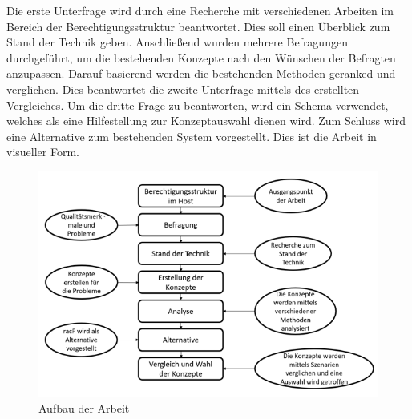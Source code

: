 Die erste Unterfrage wird durch eine Recherche mit verschiedenen Arbeiten im Bereich der Berechtigungsstruktur beantwortet.
Dies soll einen Überblick zum Stand der Technik geben.
Anschließend wurden mehrere Befragungen durchgeführt, um die bestehenden Konzepte nach den Wünschen der Befragten anzupassen.
Darauf basierend werden die bestehenden Methoden geranked und verglichen.
Dies beantwortet die zweite Unterfrage mittels des erstellten Vergleiches.
\newline
Um die dritte Frage zu beantworten, wird ein Schema verwendet, welches als eine Hilfestellung zur Konzeptauswahl dienen wird.
Zum Schluss wird eine Alternative zum bestehenden System vorgestellt.
Dies ist die Arbeit in visueller Form.
\newpage
\begin{figure}[h!]
\hspace*{-3cm}
 \centering
 \includegraphics[width=1.5\textwidth]{gfx/Picture/Vorgehen.PNG}
 \caption{Aufbau der Arbeit}
 \label{fig:vorgehen}
\end{figure}
\newpage
